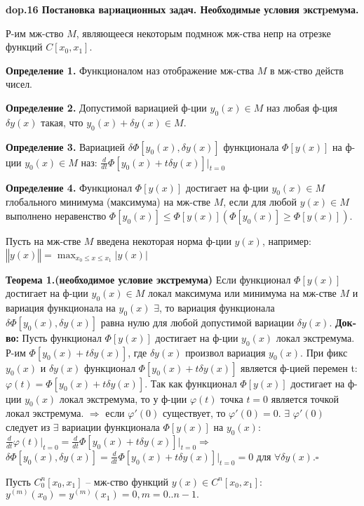 
\textbf{\LARGE dop.16 Постановка ваpиационных задач. Необходимые условия экстpемума.}

Р-им мж-ство $M$, являющееся некоторым подмнож
мж-ства непр на отрезке функций $C[x_0, x_1]$.


\textbf{Определение 1.}
Функционалом наз отображение мж-ства $M$ в мж-ство действ чисел.

\textbf{Определение 2.}
Допустимой вариацией ф-ции $y_0(x) \in M$ наз любая ф-ция $\delta y(x)$ такая, что $y_0(x) + \delta y(x) \in M$.

\textbf{Определение 3.}
Вариацией $\delta\Phi[y_0(x), \delta y(x)]$ функционала
$\Phi[y(x)]$ на ф-ции $y_0(x) \in M$ наз: $\frac{d}{dt}\Phi[y_0(x)+t\delta y(x)]\Big|_{t=0}$

\textbf{Определение 4.}
Функционал $\Phi[y(x)]$ достигает на ф-ции
$y_0(x) \in M$ глобального минимума (максимума) на мж-стве $M$, если для любой $y(x) \in M$ выполнено неравенство $\Phi[y_0(x)]\leq\Phi[y(x)]  (\Phi[y_0(x)]\geq\Phi[y(x)])$.


Пусть на мж-стве $M$ введена некоторая норма ф-ции $y(x)$, например:
$‖y(x)‖=\displaystyle\max_{x_0\leq x \leq x_1} |y(x)|$


\textbf{Теорема 1.(необходимое условие экстремума)}
    Если функционал $\Phi[y(x)]$ достигает на ф-ции
    $y_0(x) \in M$ локал максимума или минимума на мж-стве $M$ и
    вариация функционала на $y_0(x)$ $\exists$, то вариация функционала $\delta\Phi[y_0(x), \delta y(x)]$ равна нулю для любой допустимой вариации $\delta y(x)$.
\textbf{Док-во:}
    Пусть функционал $\Phi[y(x)]$ достигает на ф-ции
    $y_0(x)$ локал экстремума. Р-им $\Phi[y_0(x) + t\delta y(x)]$, где $\delta y(x)$
    произвол вариация $y_0(x)$. При фикс $y_0(x)$ и $\delta y(x)$ функционал 
    $\Phi[y_0(x) + t\delta y(x)]$ является ф-цией перемен t:
    $\varphi(t) = \Phi[y_0(x) + t\delta y(x)].$
    Так как функционал $\Phi[y(x)]$ достигает на ф-ции $y_0(x)$ локал
    экстремума, то у ф-ции $\varphi(t)$ точка $t=0$ является точкой локал экстремума. $\Longrightarrow$ если $\varphi'(0)$ существует, то
    $\varphi'(0)=0$. $\exists$ $\varphi'(0)$ следует из $\exists$ вариации функционала $\Phi[y(x)]$ на $y_0(x)$: $\frac{d}{dt}\varphi(t)\Big|_{t=0}=\frac{d}{dt}\Phi[y_0(x)+t\delta y(x)]\Big|_{t=0} \Longrightarrow$
    $\delta \Phi[y_0(x), \delta y(x)]=\frac{d}{dt}\Phi[y_0(x)+t\delta y(x)]\Big|_{t=0}=0 \text{ для } \forall \delta y(x)$.$\square$


Пусть $C^n_0 [x_0, x_1]$ -- мж-ство функций $y(x) \in C^n[x_0, x_1]:$ $y^{(m)}(x_0)=y^{(m)}(x_1)=0, m=0..n-1.$

